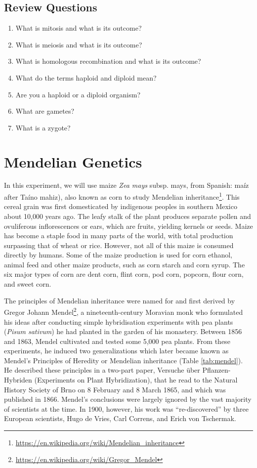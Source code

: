 \documentclass[]{book}
\providecommand{\tightlist}{%
  \setlength{\itemsep}{0pt}\setlength{\parskip}{0pt}}
\let\rmarkdownfootnote\footnote%
\def\footnote{\protect\rmarkdownfootnote}
\renewcommand{\href}[2]{#2\footnote{\url{#1}}}
\theoremstyle{definition}
\theoremstyle{definition}
\theoremstyle{definition}
\theoremstyle{remark}
\begin{document}
\section{Review Questions}\label{review-questions-6}

\begin{enumerate}
\def\labelenumi{\arabic{enumi}.}
\tightlist
\item
  What is mitosis and what is its outcome?
\item
  What is meiosis and what is its outcome?
\item
  What is homologous recombination and what is its outcome?
\item
  What do the terms haploid and diploid mean?
\item
  Are you a haploid or a diploid organism?
\item
  What are gametes?
\item
  What is a zygote?
\end{enumerate}

\chapter{Mendelian Genetics}\label{mendelian-genetics}

In this experiment, we will use maize \emph{Zea mays} subsp. mays, from
Spanish: maíz after Taíno mahiz), also known as corn to study
\href{https://en.wikipedia.org/wiki/Mendelian_inheritance}{Mendelian
inheritance}. This cereal grain was first domesticated by indigenous
peoples in southern Mexico about 10,000 years ago. The leafy stalk of
the plant produces separate pollen and ovuliferous inflorescences or
ears, which are fruits, yielding kernels or seeds. Maize has become a
staple food in many parts of the world, with total production surpassing
that of wheat or rice. However, not all of this maize is consumed
directly by humans. Some of the maize production is used for corn
ethanol, animal feed and other maize products, such as corn starch and
corn syrup. The six major types of corn are dent corn, flint corn, pod
corn, popcorn, flour corn, and sweet corn.

The principles of Mendelian inheritance were named for and first derived
by \href{https://en.wikipedia.org/wiki/Gregor_Mendel}{Gregor Johann
Mendel}, a nineteenth-century Moravian monk who formulated his ideas
after conducting simple hybridisation experiments with pea plants
(\emph{Pisum sativum}) he had planted in the garden of his monastery.
Between 1856 and 1863, Mendel cultivated and tested some 5,000 pea
plants. From these experiments, he induced two generalizations which
later became known as Mendel's Principles of Heredity or Mendelian
inheritance (Table \ref{tab:mendel}). He described these principles in a
two-part paper, Versuche über Pflanzen-Hybriden (Experiments on Plant
Hybridization), that he read to the Natural History Society of Brno on 8
February and 8 March 1865, and which was published in 1866. Mendel's
conclusions were largely ignored by the vast majority of scientists at
the time. In 1900, however, his work was ``re-discovered'' by three
European scientists, Hugo de Vries, Carl Correns, and Erich von
Tschermak.
\end{document}
